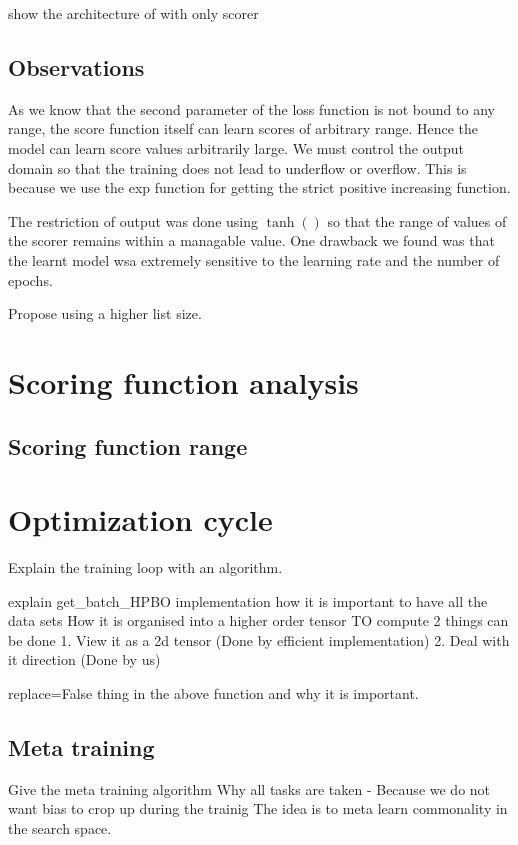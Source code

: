 \documentclass[11pt]{report}
\begin{document}
show the architecture of with only scorer


\subsection{Observations}
As we know that the second parameter of the loss function is not bound to any range, 
the score function itself can learn scores of arbitrary range.
Hence the model can learn score values arbitrarily large.
We must control the output domain so that the training does not lead to underflow or overflow.
This is because we use the exp function for getting the strict positive increasing function.

The restriction of output was done using $\tanh()$ so that the range of values of the scorer remains within a managable value.
One drawback we found was that the learnt model wsa extremely sensitive to the learning rate and the number of epochs.

  
Propose using a higher list size.

\section{Scoring function analysis}

\subsection{Scoring function range}

\section{Optimization cycle}
Explain the training loop with an algorithm.

explain get\_batch\_HPBO implementation how it is important to have all the data sets
How it is organised into a higher order tensor
TO compute 2 things can be done
  1. View it as a 2d tensor (Done by efficient implementation)
     2. Deal with it direction (Done by us)

replace=False thing in the above function and why it is important.

\subsection{Meta training}
Give the meta training algorithm
Why all tasks are taken - 
Because we do not want bias to crop up during the trainig
The idea is to meta learn commonality in the search space.
\end{document}
